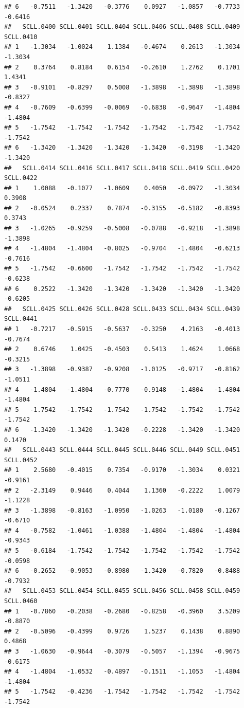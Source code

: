 \documentclass[
]{article}
\begin{document}
\begin{verbatim}
## 6   -0.7511   -1.3420   -0.3776    0.0927   -1.0857   -0.7733   -0.6416
##   SCLL.0400 SCLL.0401 SCLL.0404 SCLL.0406 SCLL.0408 SCLL.0409 SCLL.0410
## 1   -1.3034   -1.0024    1.1384   -0.4674    0.2613   -1.3034   -1.3034
## 2    0.3764    0.8184    0.6154   -0.2610    1.2762    0.1701    1.4341
## 3   -0.9101   -0.8297    0.5008   -1.3898   -1.3898   -1.3898   -0.8327
## 4   -0.7609   -0.6399   -0.0069   -0.6838   -0.9647   -1.4804   -1.4804
## 5   -1.7542   -1.7542   -1.7542   -1.7542   -1.7542   -1.7542   -1.7542
## 6   -1.3420   -1.3420   -1.3420   -1.3420   -0.3198   -1.3420   -1.3420
##   SCLL.0414 SCLL.0416 SCLL.0417 SCLL.0418 SCLL.0419 SCLL.0420 SCLL.0422
## 1    1.0088   -0.1077   -1.0609    0.4050   -0.0972   -1.3034    0.3908
## 2   -0.0524    0.2337    0.7874   -0.3155   -0.5182   -0.8393    0.3743
## 3   -1.0265   -0.9259   -0.5008   -0.0788   -0.9218   -1.3898   -1.3898
## 4   -1.4804   -1.4804   -0.8025   -0.9704   -1.4804   -0.6213   -0.7616
## 5   -1.7542   -0.6600   -1.7542   -1.7542   -1.7542   -1.7542   -0.6238
## 6    0.2522   -1.3420   -1.3420   -1.3420   -1.3420   -1.3420   -0.6205
##   SCLL.0425 SCLL.0426 SCLL.0428 SCLL.0433 SCLL.0434 SCLL.0439 SCLL.0441
## 1   -0.7217   -0.5915   -0.5637   -0.3250    4.2163   -0.4013   -0.7674
## 2    0.6746    1.0425   -0.4503    0.5413    1.4624    1.0668   -0.3215
## 3   -1.3898   -0.9387   -0.9208   -1.0125   -0.9717   -0.8162   -1.0511
## 4   -1.4804   -1.4804   -0.7770   -0.9148   -1.4804   -1.4804   -1.4804
## 5   -1.7542   -1.7542   -1.7542   -1.7542   -1.7542   -1.7542   -1.7542
## 6   -1.3420   -1.3420   -1.3420   -0.2228   -1.3420   -1.3420    0.1470
##   SCLL.0443 SCLL.0444 SCLL.0445 SCLL.0446 SCLL.0449 SCLL.0451 SCLL.0452
## 1    2.5680   -0.4015    0.7354   -0.9170   -1.3034    0.0321   -0.9161
## 2   -2.3149    0.9446    0.4044    1.1360   -0.2222    1.0079   -1.1228
## 3   -1.3898   -0.8163   -1.0950   -1.0263   -1.0180   -0.1267   -0.6710
## 4   -0.7582   -1.0461   -1.0388   -1.4804   -1.4804   -1.4804   -0.9343
## 5   -0.6184   -1.7542   -1.7542   -1.7542   -1.7542   -1.7542   -0.0598
## 6   -0.2652   -0.9053   -0.8980   -1.3420   -0.7820   -0.8488   -0.7932
##   SCLL.0453 SCLL.0454 SCLL.0455 SCLL.0456 SCLL.0458 SCLL.0459 SCLL.0460
## 1   -0.7860   -0.2038   -0.2680   -0.8258   -0.3960    3.5209   -0.8870
## 2   -0.5096   -0.4399    0.9726    1.5237    0.1438    0.8890    0.4868
## 3   -1.0630   -0.9644   -0.3079   -0.5057   -1.1394   -0.9675   -0.6175
## 4   -1.4804   -1.0532   -0.4897   -0.1511   -1.1053   -1.4804   -1.4804
## 5   -1.7542   -0.4236   -1.7542   -1.7542   -1.7542   -1.7542   -1.7542

\end{verbatim}
\end{document}
